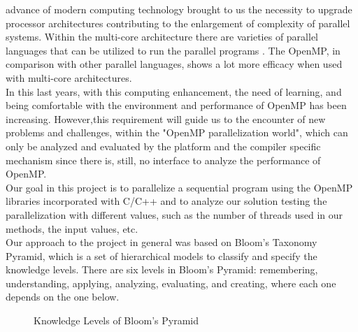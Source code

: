 \documentclass[10pt,journal,compsoc]{IEEEtran}
\begin{document}
\maketitle
\IEEEdisplaynontitleabstractindextext

\IEEEpeerreviewmaketitle



 advance of modern computing technology brought to us the necessity to upgrade processor architectures contributing to the enlargement of complexity of parallel systems. Within the multi-core architecture there are varieties of parallel languages that can be utilized to run the parallel programs \cite{surveyTools}. The OpenMP, in comparison with other parallel languages, shows a lot more efficacy when used with multi-core architectures.\\
In this last years, with this computing enhancement, the need of learning, and being comfortable with the environment and performance of OpenMP has been increasing. However,this requirement will guide us to the encounter of new problems and challenges, within the "OpenMP parallelization world", which can only be analyzed and evaluated by the platform and the compiler specific mechanism \cite{surveyTools} since there is, still, no interface to analyze the performance of OpenMP.\\
Our goal in this project is to parallelize a sequential program using the OpenMP libraries incorporated with C/C++ and to analyze our solution testing the parallelization with different values, such as the number of threads used in our methods, the input values, etc.\\
Our approach to the project in general was based on Bloom's Taxonomy Pyramid, which is a set of hierarchical models to classify and specify the knowledge levels. There are six levels in Bloom's Pyramid: remembering, understanding, applying, analyzing, evaluating, and creating, where each one depends on the one below.\\

\begin{center}
    \begin{figure}[htbp]
        \caption{Knowledge Levels of Bloom's Pyramid}
        \centering{\label{fig}}
    \end{figure}
\end{center}
\end{document}
